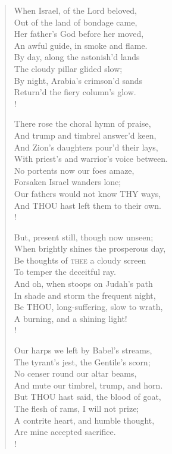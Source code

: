 \begin{verse}
When Israel, of the Lord beloved,\\
Out of the land of bondage came,\\
Her father's God before her moved,\\
An awful guide, in smoke and flame.\\
By day, along the astonish'd lands\\
The cloudy pillar glided slow;\\
By night, Arabia's crimson'd sands\\
Return'd the fiery column's glow.\\!

There rose the choral hymn of praise,\\
And trump and timbrel answer'd keen,\\
And Zion's daughters pour'd their lays,\\
With priest's and warrior's voice between.\\
No portents now our foes amaze,\\
Forsaken Israel wanders lone;\\
Our fathers would not know THY ways,\\
And THOU hast left them to their own.\\!

But, present still, though now unseen;\\
When brightly shines the prosperous day,\\
Be thoughts of \textsc{thee} a cloudy screen\\
To temper the deceitful ray.\\
And oh, when stoops on Judah's path\\
In shade and storm the frequent night,\\
Be THOU, long-suffering, slow to wrath,\\
A burning, and a shining light!\\!

Our harps we left by Babel's streams,\\
The tyrant's jest, the Gentile's scorn;\\
No censer round our altar beams,\\
And mute our timbrel, trump, and horn.\\
But THOU hast said, the blood of goat,\\
The flesh of rams, I will not prize;\\
A contrite heart, and humble thought,\\
Are mine accepted sacrifice.\\!
\end{verse}

